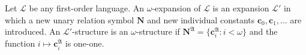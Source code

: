 Let $\mathcal{L}$ be any first-order language. An $\omega$-expansion of $\mathcal{L}$ is an expansion $\mathcal{L}'$ in which a new unary relation symbol $\mathbf{N}$ and new individual constants $\mathbf{c}_0, \mathbf{c}_1, \ldots$ are introduced. An $\mathcal{L}'$-structure is an $\omega$-structure if $\mathbf{N}^{\mathfrak{A}} = \{\mathbf{c}_i^{\mathfrak{A}} : i < \omega\}$ and the function $i \mapsto \mathbf{c}_i^{\mathfrak{A}}$ is one-one.
